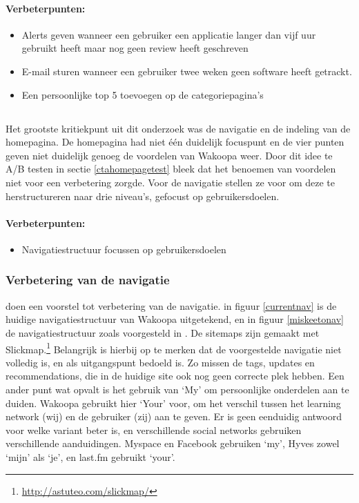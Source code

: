 \documentclass[a4paper, 10pt, pdftex]{report}
\begin{document}
    \paragraph{\textbf{Verbeterpunten:}}
      \begin{itemize}
        \item Alerts geven wanneer een gebruiker een applicatie langer dan vijf uur gebruikt heeft maar nog geen review heeft geschreven
        \item E-mail sturen wanneer een gebruiker twee weken geen software heeft getrackt.
        \item Een persoonlijke top 5 toevoegen op de categoriepagina's
      \end{itemize}

    \subsection{\cite{Hoekman2008}}
    Het grootste kritiekpunt uit dit onderzoek was de navigatie en de indeling van de homepagina. De homepagina had niet \'e\'en duidelijk focuspunt en de vier punten geven niet duidelijk genoeg de voordelen van Wakoopa weer. Door dit idee te A/B testen in sectie \ref{ctahomepagetest} bleek dat het benoemen van voordelen niet voor een verbetering zorgde. Voor de navigatie stellen ze voor om deze te herstructureren naar drie niveau's, gefocust op gebruikersdoelen.

    \paragraph{\textbf{Verbeterpunten:}}
      \begin{itemize}
        \item Navigatiestructuur focussen op gebruikersdoelen
      \end{itemize}


    \subsubsection{Verbetering van de navigatie}
      \citeauthor{Hoekman2008} doen een voorstel tot verbetering van de navigatie. in figuur \ref{currentnav} is de huidige navigatiestructuur van Wakoopa uitgetekend, en in figuur \ref{miskeetonav} de navigatiestructuur zoals voorgesteld in  \cite{Hoekman2008}. De sitemaps zijn gemaakt met Slickmap.\footnote{\url{http://astuteo.com/slickmap/}} Belangrijk is hierbij op te merken dat de voorgestelde navigatie niet volledig is, en als uitgangspunt bedoeld is. Zo missen de tags, updates en recommendations, die in de huidige site ook nog geen correcte plek hebben. Een ander punt wat opvalt is het gebruik van `My' om persoonlijke onderdelen aan te duiden. Wakoopa gebruikt hier `Your' voor, om het verschil tussen het learning network (wij) en de gebruiker (zij) aan te geven. Er is geen eenduidig antwoord voor welke variant beter is, en verschillende social networks gebruiken verschillende aanduidingen. Myspace en Facebook gebruiken `my', Hyves zowel `mijn' als `je', en last.fm gebruikt `your'.
\end{document}
